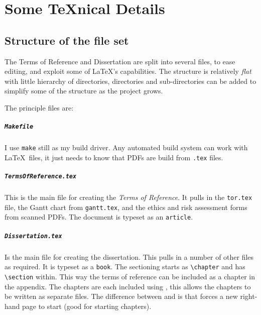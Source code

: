 
\chapter{Some TeXnical Details}

\section{Structure of the file set}
The Terms of Reference and Dissertation are split into several files, to ease
editing, and exploit some of \LaTeX's capabilities.
The structure is relatively \emph{flat} with little hierarchy of directories,
directories and sub-directories can be added to simplify some of the structure
as the project grows.

The principle files are:

\paragraph{\texttt{Makefile}} I use \texttt{make} still as my build driver.
Any automated build system can work with \LaTeX\ files, it just needs to know
that PDFs are build from \texttt{.tex} files.

\paragraph{\texttt{TermsOfReference.tex}} This is the main file for creating
the \emph{Terms of Reference}.  It pulls in the \texttt{tor.tex} file, the
Gantt chart from \texttt{gantt.tex}, and the ethics and risk assessment forms
from scanned PDFs.  The document is typeset as an \texttt{article}.

\paragraph{\texttt{Dissertation.tex}} Is the main file for creating the
dissertation.   This pulls in a number of other files as required.	
It is typeset as a \texttt{book}.  The sectioning starts as \verb'\chapter'
and has \verb'\section'  within.  This way the terms of reference can be
included as a chapter in the appendix.
The chapters are each included using \verb'',  this allows the
chapters to be written as separate files.  The difference between
\verb'' and \verb'' is that \verb'' forces a new
right-hand page to start (good for starting chapters).

